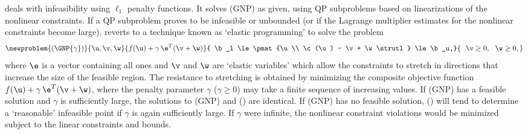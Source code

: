 \SNOPT{} deals with infeasibility using $\ell_1$ penalty functions.
%
%
It solves (GNP) as given, using QP subproblems
based on linearizations of the nonlinear constraints.
If a QP subproblem proves to be infeasible or unbounded (or if the
Lagrange multiplier estimates for the nonlinear constraints become
large), \SNOPT{} reverts to a technique known as `elastic programming' to solve the problem
\[
   \newproblem{(\GNP{\gamma})}{\u,\v,\w}{f(\u) + \gamma \, \e^T(\v + \w)}
                 { \b_l \le \pmat{\u\\ \c(\u) - \v + \w \strutl} \le \b_u,}
                 { \ \ \v \ge 0, \ \ \w \ge 0,}
\]
where $\e$ is a vector containing all ones and $\v$ and $\w$ are `elastic variables' which allow the constraints to stretch in directions that increase the size of the feasible region. The resistance to stretching is obtained by minimizing the composite objective function $f(\u) + \gamma \, \e^T(\v + \w)$, where the penalty parameter $\gamma$ ($\gamma \ge 0$) may take a
finite sequence of increasing values.  
If (GNP) has a feasible solution and $\gamma$ is sufficiently large,
the solutions to (GNP) and (\GNP{\gamma}) are identical.
If (GNP) has no feasible solution, (\GNP{\gamma}) will tend to
determine a `reasonable' infeasible point if $\gamma$ is again sufficiently
large.  If $\gamma$ were infinite, the nonlinear constraint violations would
be minimized subject to the linear constraints and bounds.

